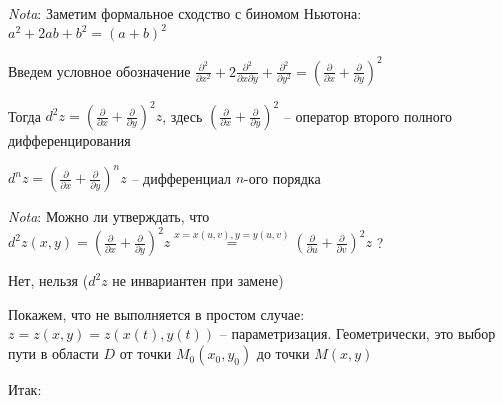 \documentclass[12pt]{article}
\begin{document}
    \textit{Nota}: Заметим формальное сходство с биномом Ньютона: $\displaystyle a^2 + 2ab + b^2 = (a + b)^2$

    Введем условное обозначение $\displaystyle \frac{\partial^2}{\partial x^2} + 2 \frac{\partial^2}{\partial x \partial y} + \frac{\partial^2}{\partial y^2} = \left(\frac{\partial}{\partial x} + \frac{\partial}{\partial y}\right)^2$

    Тогда $\displaystyle d^2 z = \left(\frac{\partial}{\partial x} + \frac{\partial}{\partial y}\right)^2 z$, здесь $\displaystyle \left(\frac{\partial}{\partial x} + \frac{\partial}{\partial y}\right)^2$ -- оператор второго полного дифференцирования

    $\displaystyle d^n z = \left(\frac{\partial}{\partial x} + \frac{\partial}{\partial y}\right)^n z$ -- дифференциал $\displaystyle n$-ого порядка

    \hypertarget{noninvariantofseconddifferentialoffunctionoftwovariables}{}

    \textit{Nota}: Можно ли утверждать, что $\displaystyle d^2 z(x, y) = \left(\frac{\partial}{\partial x} + \frac{\partial}{\partial y}\right)^2 z \stackrel{x = x(u, v), y = y(u, v)}{=} \left(\frac{\partial}{\partial u} + \frac{\partial}{\partial v}\right)^2 z$ ?

    Нет, нельзя ($d^2 z$ не инвариантен при замене)

    Покажем, что не выполняется в простом случае: $\displaystyle z  = z(x, y) = z(x(t), y(t))$ -- параметризация.
    Геометрически, это выбор пути в области $\displaystyle D$ от точки $\displaystyle M_0(x_0, y_0)$ до точки $\displaystyle M(x, y)$

    Итак:
\end{document}
